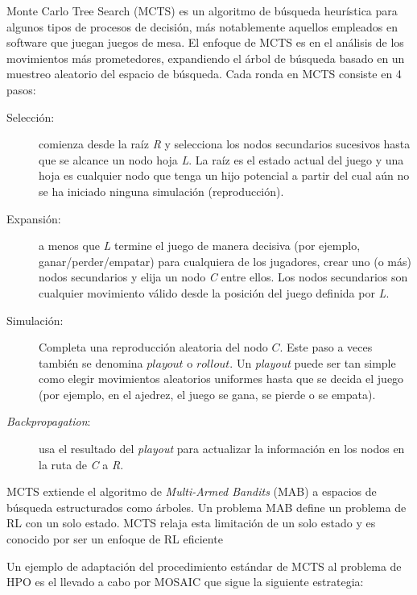 Monte Carlo Tree Search (MCTS) es un algoritmo de búsqueda heurística para algunos tipos de procesos de decisión, más notablemente aquellos empleados en software que juegan juegos de mesa. El enfoque de MCTS es en el análisis de los movimientos más prometedores, expandiendo el árbol de búsqueda basado en un muestreo aleatorio del espacio de búsqueda. Cada ronda en MCTS consiste en 4 pasos:
\begin{description}
	\item[Selección:] comienza desde la raíz \textit{R} y selecciona los nodos secundarios sucesivos hasta que se alcance un nodo hoja \textit{L}. La raíz es el estado actual del juego y una hoja es cualquier nodo que tenga un hijo potencial a partir del cual aún no se ha iniciado ninguna simulación (reproducción). %
	\item[Expansión:] a menos que \textit{L} termine el juego de manera decisiva (por ejemplo, ganar/perder/empatar) para cualquiera de los jugadores, crear uno (o más) nodos secundarios y elija un nodo \textit{C} entre ellos. Los nodos secundarios son cualquier movimiento válido desde la posición del juego definida por \textit{L}.
	\item[Simulación:] Completa una reproducción aleatoria del nodo $C$. Este paso a veces también se denomina $playout$ o $rollout$. Un \textit{playout} puede ser tan simple como elegir movimientos aleatorios uniformes hasta que se decida el juego (por ejemplo, en el ajedrez, el juego se gana, se pierde o se empata).
	\item[\textit{Backpropagation}:] usa el resultado del \textit{playout} para actualizar la información en los nodos en la ruta de \textit{C} a \textit{R}. 
\end{description}

MCTS extiende el algoritmo de \textit{Multi-Armed Bandits} (MAB) a espacios de búsqueda estructurados como árboles. Un problema MAB define un problema de RL con un solo estado. MCTS relaja esta limitación de un solo estado y es conocido por ser un enfoque de RL eficiente \cite{rakotoarison2019automated}

Un ejemplo de adaptación del procedimiento estándar de MCTS al problema de HPO es el llevado a cabo por MOSAIC \cite{rakotoarison2019automated} que sigue la siguiente estrategia:

